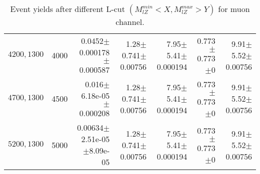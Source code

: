 \documentclass[]{article}
\begin{document}
\begin{table}
\begin{center}
{\begin{tabular}{ |r|r|r|r|r|r|r|}
$4200,1300$ & 4000 & 0.0452$\pm$0.000178$\pm$0.000587 & 1.28$\pm$0.741$\pm$0.00756 & 7.95$\pm$5.41$\pm$0.000194 & 0.773$\pm$0.773$\pm$0 & 9.91$\pm$5.52$\pm$0.00756 \\
$4700,1300$ & 4500 & 0.016$\pm$6.18e-05$\pm$0.000208 & 1.28$\pm$0.741$\pm$0.00756 & 7.95$\pm$5.41$\pm$0.000194 & 0.773$\pm$0.773$\pm$0 & 9.91$\pm$5.52$\pm$0.00756 \\
$5200,1300$ & 5000 & 0.00634$\pm$2.51e-05$\pm$8.09e-05 & 1.28$\pm$0.741$\pm$0.00756 & 7.95$\pm$5.41$\pm$0.000194 & 0.773$\pm$0.773$\pm$0 & 9.91$\pm$5.52$\pm$0.00756 \\
\hline 
\end{tabular}
}
\end{center}
\caption{Event yields after different L-cut $(M_{lZ}^{min} < X, M_{lZ}^{max} > Y)$ for muon channel.}
\end{table}
\end{document}
